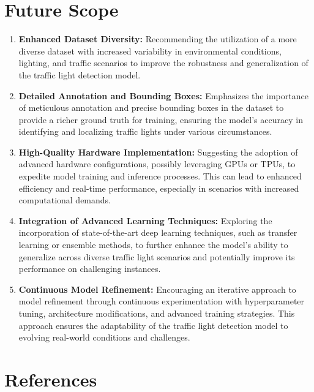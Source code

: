 \documentclass[12 pt]{report}
\begin{document}
\begin{flushleft}
\end{flushleft}
\newpage
\section{Future Scope}
\begin{justify}
\begin{enumerate}
    \item \textbf{Enhanced Dataset Diversity:}
    Recommending the utilization of a more diverse dataset with increased variability in environmental conditions, lighting, and traffic scenarios to improve the robustness and generalization of the traffic light detection model.
    \item \textbf{Detailed Annotation and Bounding Boxes:}
    Emphasizes the importance of meticulous annotation and precise bounding boxes in the dataset to provide a richer ground truth for training, ensuring the model's accuracy in identifying and localizing traffic lights under various circumstances.
    \item \textbf{High-Quality Hardware Implementation:}
    Suggesting the adoption of advanced hardware configurations, possibly leveraging GPUs or TPUs, to expedite model training and inference processes. This can lead to enhanced efficiency and real-time performance, especially in scenarios with increased computational demands.
    \item \textbf{Integration of Advanced Learning Techniques:}
    Exploring the incorporation of state-of-the-art deep learning techniques, such as transfer learning or ensemble methods, to further enhance the model's ability to generalize across diverse traffic light scenarios and potentially improve its performance on challenging instances.
    \item \textbf{Continuous Model Refinement:}
    Encouraging an iterative approach to model refinement through continuous experimentation with hyperparameter tuning, architecture modifications, and advanced training strategies. This approach ensures the adaptability of the traffic light detection model to evolving real-world conditions and challenges.
\end{enumerate}
\end{justify}
\newpage
\section*{References}
\end{document}
